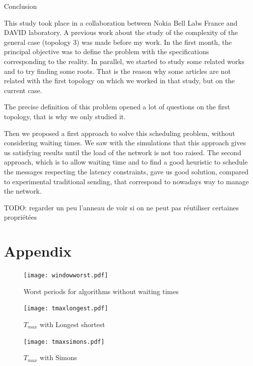 \documentclass[a4paper,10pt]{report}
\newcommand{\todo}[1]{}
\renewcommand{\todo}[1]{{\color{red} TODO: {#1}}}
\begin{document}
\begin{chapter}{Conclusion}

This study took place in a collaboration between Nokia Bell Labs France and DAVID laboratory.
A previous work about the study of the complexity of the general case (topology 3) was made before my work.
In the first month, the principal objective was to define the problem with the specifications corresponding to the reality.
In parallel, we started to study some related works and to try finding some roots. That is the reason why some articles are not related
with the first topology on which we worked in that study, but on the current case.

The precise definition of this problem opened a lot of questions on the first topology, that is why we only studied it.

Then we proposed a first approach to solve this scheduling problem, without considering waiting times. We saw with the simulations 
that this approach gives us satisfying results until the load of the network is not too raised.
The second approach, which is to allow waiting time and to find a good heuristic to schedule the messages respecting the latency constraints,
gave us good solution, compared to experimental traditional sending, that correspond to nowadays way to manage the network.

\todo{regarder un peu l'anneau de voir si on ne peut pas réutiliser certaines propriétées}


\end{chapter}
\appendix

\chapter*{Appendix}

 
\begin{figure}[H]
\hspace*{-3cm}
\centering
\texttt{[image: windowworst.pdf]}%
\caption{Worst periods for algorithms without waiting times}
\end{figure}

\begin{figure}[H]
\hspace*{-3cm}
\centering
\texttt{[image: tmaxlongest.pdf]}%
\caption{$T_{max}$ with Longest shortest}
\end{figure}

\begin{figure}[H]
\hspace*{-3cm}
\centering
\texttt{[image: tmaxsimons.pdf]}%
\caption{$T_{max}$ with Simons}
\end{figure}
\end{document}
